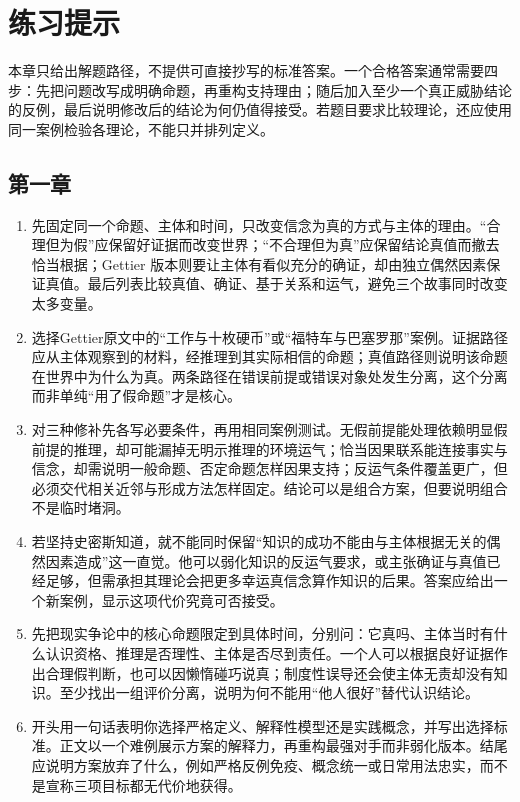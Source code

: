 \chapter{练习提示}

本章只给出解题路径，不提供可直接抄写的标准答案。一个合格答案通常需要四步：先把问题改写成明确命题，再重构支持理由；随后加入至少一个真正威胁结论的反例，最后说明修改后的结论为何仍值得接受。若题目要求比较理论，还应使用同一案例检验各理论，不能只并排列定义。

\section*{第一章}

\begin{enumerate}
\item 先固定同一个命题、主体和时间，只改变信念为真的方式与主体的理由。“合理但为假”应保留好证据而改变世界；“不合理但为真”应保留结论真值而撤去恰当根据；Gettier 版本则要让主体有看似充分的确证，却由独立偶然因素保证真值。最后列表比较真值、确证、基于关系和运气，避免三个故事同时改变太多变量。
\item 选择Gettier原文中的“工作与十枚硬币”或“福特车与巴塞罗那”案例。证据路径应从主体观察到的材料，经推理到其实际相信的命题；真值路径则说明该命题在世界中为什么为真。两条路径在错误前提或错误对象处发生分离，这个分离而非单纯“用了假命题”才是核心。
\item 对三种修补先各写必要条件，再用相同案例测试。无假前提能处理依赖明显假前提的推理，却可能漏掉无明示推理的环境运气；恰当因果联系能连接事实与信念，却需说明一般命题、否定命题怎样因果支持；反运气条件覆盖更广，但必须交代相关近邻与形成方法怎样固定。结论可以是组合方案，但要说明组合不是临时堵洞。
\item 若坚持史密斯知道，就不能同时保留“知识的成功不能由与主体根据无关的偶然因素造成”这一直觉。他可以弱化知识的反运气要求，或主张确证与真值已经足够，但需承担其理论会把更多幸运真信念算作知识的后果。答案应给出一个新案例，显示这项代价究竟可否接受。
\item 先把现实争论中的核心命题限定到具体时间，分别问：它真吗、主体当时有什么认识资格、推理是否理性、主体是否尽到责任。一个人可以根据良好证据作出合理假判断，也可以因懒惰碰巧说真；制度性误导还会使主体无责却没有知识。至少找出一组评价分离，说明为何不能用“他人很好”替代认识结论。
\item 开头用一句话表明你选择严格定义、解释性模型还是实践概念，并写出选择标准。正文以一个难例展示方案的解释力，再重构最强对手而非弱化版本。结尾应说明方案放弃了什么，例如严格反例免疫、概念统一或日常用法忠实，而不是宣称三项目标都无代价地获得。
\end{enumerate}

